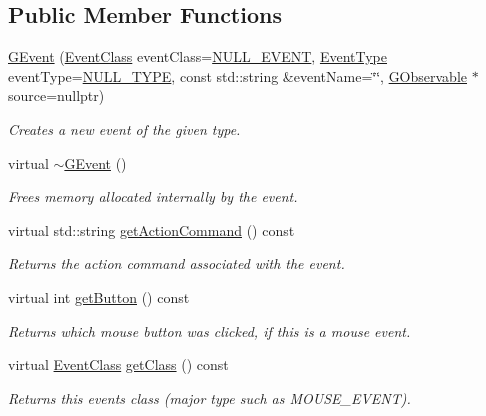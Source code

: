 \subsection*{Public Member Functions}
\begin{DoxyCompactItemize}
\item 
\mbox{\hyperlink{classsgl_1_1GEvent_a310475311d619e2b4066a0ee34c1153e}{G\+Event}} (\mbox{\hyperlink{namespacesgl_a6ff6e8ee75a08092e30167b2b7c5d6f7}{Event\+Class}} event\+Class=\mbox{\hyperlink{namespacesgl_a6ff6e8ee75a08092e30167b2b7c5d6f7ad986036666e3b6f3a053e2b1f43c1495}{N\+U\+L\+L\+\_\+\+E\+V\+E\+NT}}, \mbox{\hyperlink{namespacesgl_a2628ea8d12e8b2563c32f05dc7fff6fa}{Event\+Type}} event\+Type=\mbox{\hyperlink{namespacesgl_a2628ea8d12e8b2563c32f05dc7fff6faa74cf8825b522b9721ea02973803d76b4}{N\+U\+L\+L\+\_\+\+T\+Y\+PE}}, const std\+::string \&event\+Name=\char`\"{}\char`\"{}, \mbox{\hyperlink{classsgl_1_1GObservable}{G\+Observable}} $\ast$source=nullptr)
\begin{DoxyCompactList}\small\item\em Creates a new event of the given type. \end{DoxyCompactList}\item 
virtual \mbox{\hyperlink{classsgl_1_1GEvent_a294ad1d22669baa2bae04f3d75eb183c}{$\sim$\+G\+Event}} ()
\begin{DoxyCompactList}\small\item\em Frees memory allocated internally by the event. \end{DoxyCompactList}\item 
virtual std\+::string \mbox{\hyperlink{classsgl_1_1GEvent_a94eb4276000c4fdfb508ce9e6317a82a}{get\+Action\+Command}} () const
\begin{DoxyCompactList}\small\item\em Returns the action command associated with the event. \end{DoxyCompactList}\item 
virtual int \mbox{\hyperlink{classsgl_1_1GEvent_a206a3a5ac61ccb2de0208401739c5425}{get\+Button}} () const
\begin{DoxyCompactList}\small\item\em Returns which mouse button was clicked, if this is a mouse event. \end{DoxyCompactList}\item 
virtual \mbox{\hyperlink{namespacesgl_a6ff6e8ee75a08092e30167b2b7c5d6f7}{Event\+Class}} \mbox{\hyperlink{classsgl_1_1GEvent_a389eadf538a5311effff6a08d0426b34}{get\+Class}} () const
\begin{DoxyCompactList}\small\item\em Returns this event\textquotesingle{}s class (major type such as M\+O\+U\+S\+E\+\_\+\+E\+V\+E\+NT). \end{DoxyCompactList}\item 

\end{DoxyCompactItemize}
